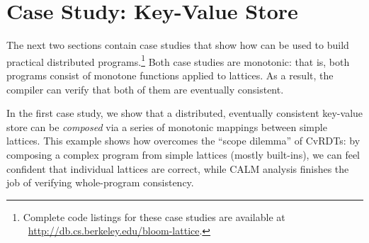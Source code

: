 \section{Case Study: Key-Value Store}
\label{sec:kvs}
The next two sections contain case studies that show how \lang can be used to
build practical distributed programs.\footnote{Complete code listings for these
  case studies are available at \mbox{\small
    \url{http://db.cs.berkeley.edu/bloom-lattice}}.} Both case studies are
monotonic: that is, both programs consist of monotone functions applied to
lattices. As a result, the \lang compiler can verify that both of them are
eventually consistent.

In the first case study, we show that a distributed, eventually consistent
key-value store can be \emph{composed} via a series of monotonic mappings
between simple lattices. This example shows how \lang overcomes
the ``scope dilemma'' of CvRDTs: by composing a complex program from simple
lattices (mostly \lang built-ins), we can feel confident that individual
lattices are correct, while CALM analysis finishes the job of verifying
whole-program consistency.




